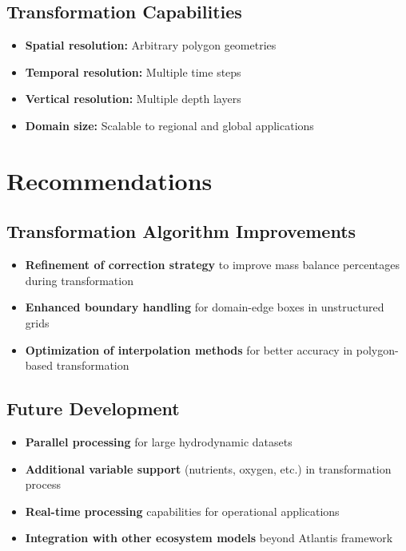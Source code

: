 \documentclass[12pt,a4paper,twoside,times,sky,formal]{csiroreport2017}
\begin{document}
\subsection{Transformation Capabilities}
\begin{itemize}
\item \textbf{Spatial resolution:} Arbitrary polygon geometries
\item \textbf{Temporal resolution:} Multiple time steps
\item \textbf{Vertical resolution:} Multiple depth layers
\item \textbf{Domain size:} Scalable to regional and global applications
\end{itemize}

\section{Recommendations}

\subsection{Transformation Algorithm Improvements}
\begin{itemize}
\item \textbf{Refinement of correction strategy} to improve mass balance percentages during transformation
\item \textbf{Enhanced boundary handling} for domain-edge boxes in unstructured grids
\item \textbf{Optimization of interpolation methods} for better accuracy in polygon-based transformation
\end{itemize}

\subsection{Future Development}
\begin{itemize}
\item \textbf{Parallel processing} for large hydrodynamic datasets
\item \textbf{Additional variable support} (nutrients, oxygen, etc.) in transformation process
\item \textbf{Real-time processing} capabilities for operational applications
\item \textbf{Integration with other ecosystem models} beyond Atlantis framework
\end{itemize}

\newpage
\end{document}

